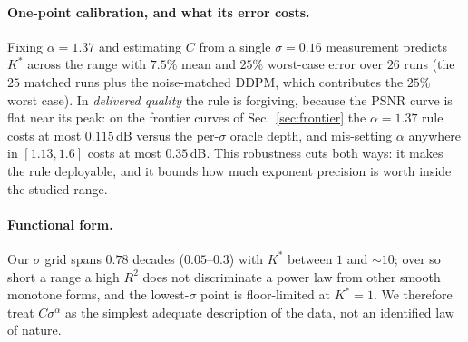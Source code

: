 \documentclass[letterpaper]{article}
\begin{document}
\paragraph{One-point calibration, and what its error costs.} Fixing $\alpha=1.37$ and estimating $C$ from
a single $\sigma=0.16$ measurement predicts $K^{*}$ across the range with $7.5\%$ mean and $25\%$
worst-case error over $26$ runs (the $25$ matched runs plus the noise-matched DDPM, which contributes the
$25\%$ worst case). In \emph{delivered quality} the rule is forgiving, because the PSNR curve is flat near
its peak: on the frontier curves of Sec.~\ref{sec:frontier} the $\alpha=1.37$ rule costs at most
$0.115$\,dB versus the per-$\sigma$ oracle depth, and mis-setting $\alpha$ anywhere in $[1.13,1.6]$ costs
at most $0.35$\,dB. This robustness cuts both ways: it makes the rule deployable, and it bounds how much
exponent precision is worth inside the studied range.
\paragraph{Functional form.} Our $\sigma$ grid spans $0.78$ decades ($0.05$--$0.3$) with $K^{*}$ between
$1$ and ${\sim}10$; over so short a range a high $R^{2}$ does not discriminate a power law from other
smooth monotone forms, and the lowest-$\sigma$ point is floor-limited at $K^{*}{=}1$. We therefore treat
$C\sigma^{\alpha}$ as the simplest adequate description of the data, not an identified law of nature.
\end{document}
